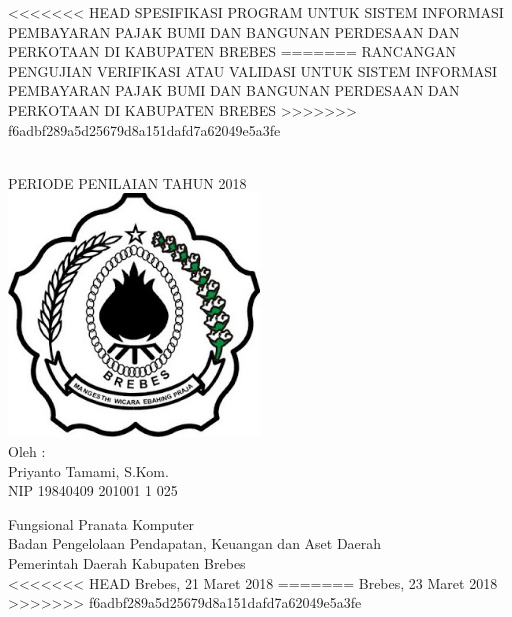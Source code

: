 \begin{titlepage}

\begin{center}
<<<<<<< HEAD
{\large SPESIFIKASI PROGRAM UNTUK SISTEM INFORMASI PEMBAYARAN PAJAK BUMI DAN BANGUNAN PERDESAAN DAN PERKOTAAN DI KABUPATEN BREBES}
=======
{\large RANCANGAN PENGUJIAN VERIFIKASI ATAU VALIDASI UNTUK SISTEM INFORMASI PEMBAYARAN PAJAK BUMI DAN BANGUNAN PERDESAAN DAN PERKOTAAN DI KABUPATEN BREBES}
>>>>>>> f6adbf289a5d25679d8a151dafd7a62049e5a3fe

\HRule\\[1cm]

PERIODE PENILAIAN TAHUN 2018\\[1cm]

\includegraphics[width=0.5\textwidth]{./resources/logo}\\[1cm]

Oleh :\\
Priyanto Tamami, S.Kom.\\
NIP 19840409 201001 1 025\\


\vfill


Fungsional Pranata Komputer\\
Badan Pengelolaan Pendapatan, Keuangan dan Aset Daerah\\
Pemerintah Daerah Kabupaten Brebes\\
<<<<<<< HEAD
Brebes, 21 Maret 2018
=======
Brebes, 23 Maret 2018
>>>>>>> f6adbf289a5d25679d8a151dafd7a62049e5a3fe
\end{center}

\end{titlepage}